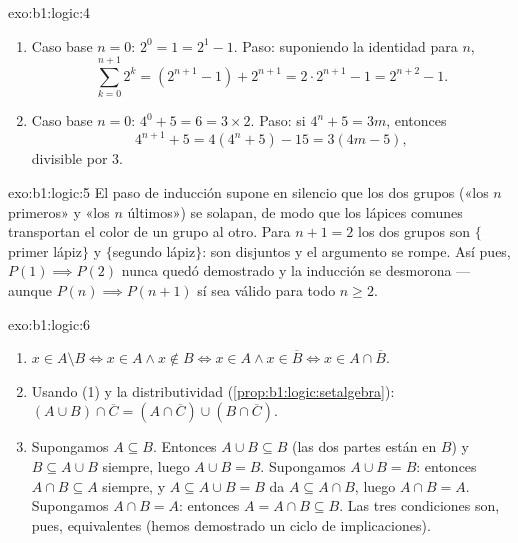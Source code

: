 \begin{solution}{exo:b1:logic:4}
\begin{enumerate}
  \item Caso base $n = 0$: $2^0 = 1 = 2^1 - 1$. Paso: suponiendo la
        identidad para $n$,
        \[
        \sum_{k=0}^{n+1} 2^k = (2^{n+1} - 1) + 2^{n+1}
        = 2 \cdot 2^{n+1} - 1 = 2^{n+2} - 1 .
        \]
  \item Caso base $n = 0$: $4^0 + 5 = 6 = 3 \times 2$. Paso: si
        $4^n + 5 = 3m$, entonces
        \[
        4^{n+1} + 5 = 4(4^n + 5) - 15 = 3(4m - 5),
        \]
        divisible por $3$.
\end{enumerate}
\end{solution}

\begin{solution}{exo:b1:logic:5}
El paso de inducción supone en silencio que los dos grupos («los $n$
primeros» y «los $n$ últimos») se solapan, de modo que los lápices
comunes transportan el color de un grupo al otro. Para $n + 1 = 2$ los
dos grupos son $\{$primer lápiz$\}$ y $\{$segundo lápiz$\}$: son
disjuntos y el argumento se rompe. Así pues, $P(1) \implies P(2)$ nunca
quedó demostrado y la inducción se desmorona --- aunque
$P(n) \implies P(n+1)$ sí sea válido para todo $n \geq 2$.
\end{solution}

\begin{solution}{exo:b1:logic:6}
\begin{enumerate}
  \item $x \in A \setminus B \iff x \in A \land x \notin B \iff x \in
        A \land x \in \overline{B} \iff x \in A \cap \overline{B}$.
  \item Usando (1) y la distributividad
        (\cref{prop:b1:logic:setalgebra}):
        $(A \cup B) \cap \overline{C} = (A \cap \overline{C}) \cup
        (B \cap \overline{C})$.
  \item Supongamos $A \subseteq B$. Entonces $A \cup B \subseteq B$ (las
        dos partes están en $B$) y $B \subseteq A \cup B$ siempre, luego
        $A \cup B = B$. Supongamos $A \cup B = B$: entonces $A \cap B
        \subseteq A$ siempre, y $A \subseteq A \cup B = B$ da
        $A \subseteq A \cap B$, luego $A \cap B = A$. Supongamos
        $A \cap B = A$: entonces $A = A \cap B \subseteq B$. Las tres
        condiciones son, pues, equivalentes (hemos demostrado un ciclo
        de implicaciones).
\end{enumerate}
\end{solution}


